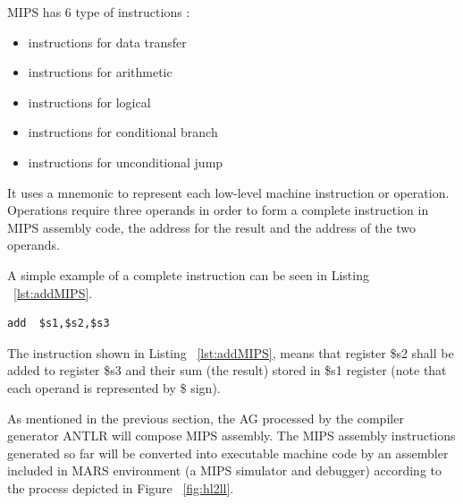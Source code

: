\documentclass[
  oneside,
  11pt, a4paper,
  footinclude=true,
  headinclude=true,
  cleardoublepage=empty
]{scrbook}
\begin{document}
MIPS has 6 type of instructions :

\begin{itemize}
  \item instructions for data transfer
  \item instructions for arithmetic
  \item instructions for logical
  \item instructions for conditional branch
  \item instructions for unconditional jump
\end{itemize}


It uses a mnemonic to represent each low-level machine instruction or operation.
Operations require three operands in order to form a complete instruction in MIPS assembly code, the address for the result and the address of the two operands.

A simple example of a complete instruction can be seen in Listing ~\ref{lst:addMIPS}.

\begin{lstlisting}[caption={Sum of two registers in MIPS assembly code},label={lst:addMIPS}]
  add  $s1,$s2,$s3
\end{lstlisting}

The instruction shown in Listing ~\ref{lst:addMIPS}, means that register \$s2 shall be added to register \$s3 and their sum (the result) stored in \$s1 register (note that each operand is represented by \$ sign).

As mentioned in the previous section, the AG processed by the compiler generator ANTLR will compose MIPS assembly. The MIPS assembly instructions generated so far will be converted into executable machine code by an assembler included in MARS environment (a MIPS simulator and debugger) according to the process depicted in Figure ~\ref{fig:hl2ll}.
\end{document}
